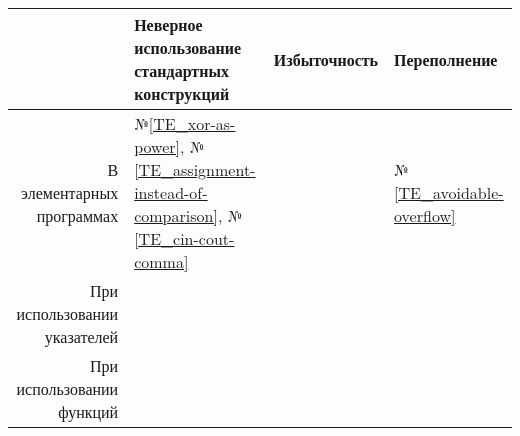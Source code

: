 \begin{center}
	\begin{tabular}{|r|m{4.5cm}|m{4cm}|m{4cm}|}\hline
		 & Неверное использование стандартных конструкций & Избыточность & Переполнение
		\\\hline
			В элементарных программах
		& 
			№\ref{TE_xor-as-power},
			№\ref{TE_assignment-instead-of-comparison},
			№\ref{TE_cin-cout-comma}
		&
		&
			№\ref{TE_avoidable-overflow}
		\\\hline
			При использовании указателей
		&
		&
		&
		\\\hline
		При использовании функций
		&
		&
		&
		\\\hline
	\end{tabular}
\end{center}
